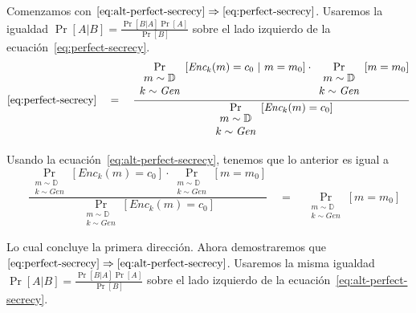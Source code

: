 \begin{enumerate}
    Comenzamos con $\eqref{eq:alt-perfect-secrecy}\Rightarrow\eqref{eq:perfect-secrecy}$. Usaremos la igualdad $\Pr[A|B]=\frac{\Pr[B|A]\Pr[A]}{\Pr[B]}$ sobre el lado izquierdo de la ecuación~\eqref{eq:perfect-secrecy}.
    \begin{equation*}
      \eqref{eq:perfect-secrecy}\quad = \quad \frac{\underset{ \begin{array}{cc} m\sim\mathbb{D}\\ k\sim\textit{Gen} \end{array} } {\Pr}[\textit{Enc}_k(m)=c_0\ |\ m=m_0]\cdot \underset{ \begin{array}{cc} m\sim\mathbb{D}\\ k\sim\textit{Gen} \end{array} } {\Pr}[m=m_0]}{\underset{ \begin{array}{cc} m\sim\mathbb{D}\\ k\sim\textit{Gen} \end{array} } {\Pr}[\textit{Enc}_k(m)=c_0]}
    \end{equation*}

    Usando la ecuación~\eqref{eq:alt-perfect-secrecy}, tenemos que lo anterior es igual a
    \begin{equation*}
     \quad \frac{\underset{ \begin{array}{cc} m\sim\mathbb{D}\\ k\sim\textit{Gen} \end{array} } {\Pr}[\textit{Enc}_k(m)=c_0]\cdot \underset{ \begin{array}{cc} m\sim\mathbb{D}\\ k\sim\textit{Gen} \end{array} } {\Pr}[m=m_0]}{\underset{ \begin{array}{cc} m\sim\mathbb{D}\\ k\sim\textit{Gen} \end{array} } {\Pr}[\textit{Enc}_k(m)=c_0]}\quad = \quad \underset{ \begin{array}{cc} m\sim\mathbb{D}\\ k\sim\textit{Gen} \end{array} } {\Pr}[m=m_0]
    \end{equation*}

    Lo cual concluye la primera dirección. Ahora demostraremos que $\eqref{eq:perfect-secrecy}\Rightarrow\eqref{eq:alt-perfect-secrecy}$. Usaremos la misma igualdad $\Pr[A|B]=\frac{\Pr[B|A]\Pr[A]}{\Pr[B]}$ sobre el lado izquierdo de la ecuación~\eqref{eq:alt-perfect-secrecy}.


\end{enumerate}
